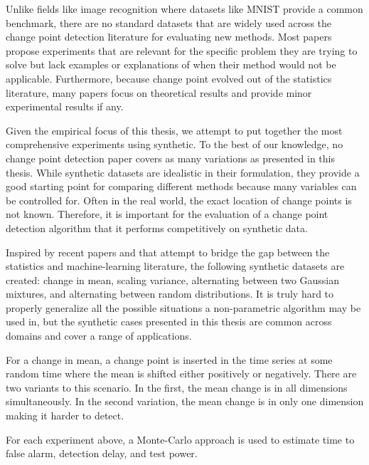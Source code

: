 Unlike fields like image recognition where datasets like MNIST provide a common benchmark, there are no standard datasets that are widely used across the change point detection literature for evaluating new methods. Most papers propose experiments that are relevant for the specific problem they are trying to solve  but lack examples or explanations of when their method would not be applicable.  Furthermore, because change point evolved out of the statistics literature, many papers focus on theoretical results and provide minor experimental results if any.

Given the empirical focus of this thesis, we attempt to put together the most comprehensive experiments using synthetic. To the best of our knowledge, no change point detection paper covers as many variations as presented in this thesis. While synthetic datasets are idealistic in their formulation, they provide a good starting point for comparing different methods because many variables can be controlled for. Often in the real world, the exact location of change points is not known. Therefore, it is important for the evaluation of a change point detection algorithm that it performs competitively on synthetic data.

Inspired by recent papers \cite{chang2019kernel} and \cite{flynn2019change} that attempt to bridge the gap between the statistics and machine-learning literature, the following synthetic datasets are created: change in mean, scaling variance, alternating between two Gaussian mixtures, and alternating between random distributions. It is truly hard to properly generalize all the possible situations a non-parametric algorithm may be used in, but the synthetic cases presented in this thesis are common across domains and cover a range of applications.

For a change in mean, a change point is inserted in the time series at some random time where the mean is shifted either positively or negatively. There are two variants to this scenario. In the first, the mean change is in all dimensions simultaneously. In the second variation, the mean change is in only one dimension making it harder to detect. 

For each experiment above, a Monte-Carlo approach is used to estimate time to false alarm, detection delay, and test power. 

